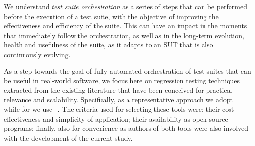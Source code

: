 

 

We understand \textit{test suite orchestration} as a series of steps that can be performed before the execution of a test suite, with the objective of improving the effectiveness and efficiency of the suite.
This can have an impact in the moments that immediately follow the orchestration, as well as in the long-term evolution, health and usefulness of the suite, as it adapts to an SUT that is also continuously evolving.

As a step towards the goal of fully automated orchestration of test suites that can be useful in real-world software, 
we focus here on regression testing techniques extracted from the existing literature that have been conceived for practical relevance and scalability.
Specifically, as a representative \tcs approach we adopt \ek~\cite{gligoricEk} while for \tcp we use \fs~\cite{miranda_fast_2018}.
The criteria used for selecting these tools were: their cost-effectiveness and simplicity of application; their availability as open-source programs; finally, also for convenience as authors of both tools were also involved with the development of the current study.

